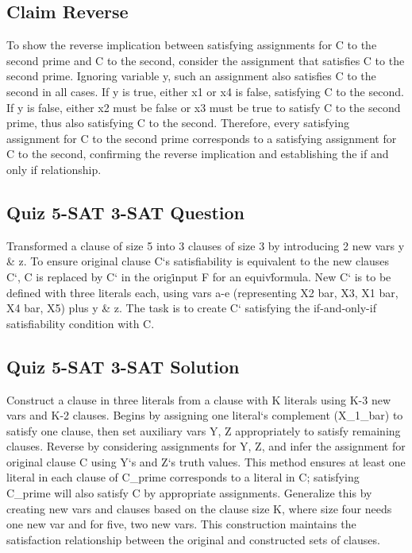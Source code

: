 \subsection*{Claim  Reverse}
To show the reverse implication between satisfying assignments for C to the second prime and C to the second, consider the assignment that satisfies C to the second prime.
Ignoring variable y, such an assignment also satisfies C to the second in all cases.
If y is true, either x1 or x4 is false, satisfying C to the second.
If y is false, either x2 must be false or x3 must be true to satisfy C to the second prime, thus also satisfying C to the second.
Therefore, every satisfying assignment for C to the second prime corresponds to a satisfying assignment for C to the second, confirming the reverse implication and establishing the if and only if relationship.

\subsection*{Quiz  5-SAT 3-SAT Question}
Transformed a clause of size 5 into 3 clauses of size 3 by introducing 2 new vars y \& z.
To ensure original clause C`s satisfiability is equivalent to the new clauses C`, C is replaced by C` in the orig\. input F for an equiv\. formula.
New C` is to be defined with three literals each, using vars a-e (representing X2 bar, X3, X1 bar, X4 bar, X5) plus y \& z.
The task is to create C` satisfying the if-and-only-if satisfiability condition with C\@.

\subsection*{Quiz  5-SAT 3-SAT Solution}
Construct a clause in three literals from a clause with K literals using K-3 new vars and K-2 clauses.
Begins by assigning one literal`s complement (X\_1\_bar) to satisfy one clause, then set auxiliary vars Y, Z appropriately to satisfy remaining clauses.
Reverse by considering assignments for Y, Z, and infer the assignment for original clause C using Y`s and Z`s truth values.
This method ensures at least one literal in each clause of C\_prime corresponds to a literal in C; satisfying C\_prime will also satisfy C by appropriate assignments.
Generalize this by creating new vars and clauses based on the clause size K, where size four needs one new var and for five, two new vars.
This construction maintains the satisfaction relationship between the original and constructed sets of clauses.

